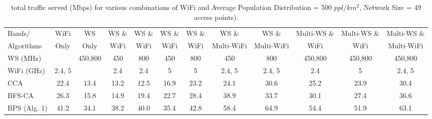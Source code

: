 \begin{table}
\centering %
\begin{tabular}{|l|c|c|c|c|c|c|c|c|c|c|c|} %
\hline %
Bands/     & WiFi    & WS      & WS \& & WS \& &  WS \& & WS \& & WS \&      &  WS \&      & Multi-WS \& & Multi-WS \& & Multi-WS \& \\%
Algorithms & Only    & Only    & WiFi  & WiFi  &  WiFi  & WiFi  & Multi-WiFi &  Multi-WiFi & WiFi        & WiFi        & Multi-WiFi  \\
\hline %
WS (MHz)   &                                                        & 450,800 & 450 &  800  &  450   & 800               & 450    & 800      & 450,800     & 450,800     & 450,800     \\
\hline
WiFi (GHz) & 2.4, 5 &                                                             & 2.4 &  2.4  &  5   & 5               & 2.4, 5& 2.4, 5        & 2.4             & 5         & 2.4, 5     \\ %
\hline
\hline %
CCA~\cite{draves2004routing}                & 22.4   &  13.4  & 13.2    &12.5    & 16.9       & 23.2   &  24.1  &   30.6&  25.2  &       23.9       &   30.4          \\      
\hline %
BFS-CA~\cite{ramachandran2006interference}  & 26.3   &  15.8  & 14.9    & 19.4   & 22.7       & 28.4   &  38.9  &   33.7&  30.1  &       27.4       &       36.6      \\      
\hline %
BPS (Alg. 1)                                & 41.2   & 34.1   &  38.2  & 40.0    & 35.4       & 42.8   & 58.4   &  64.9 &  54.4  &       51.9       &       63.1      \\      
\hline %
\end{tabular}    
\caption{ total traffic served (Mbps) for various combinations of WiFi and Average Population Distribution = 500 $ppl/km^2$, Network Size = 49 access points).} %
\label{tab:2channelcombination}    
\vspace{-0.4in}
\end{table}    


